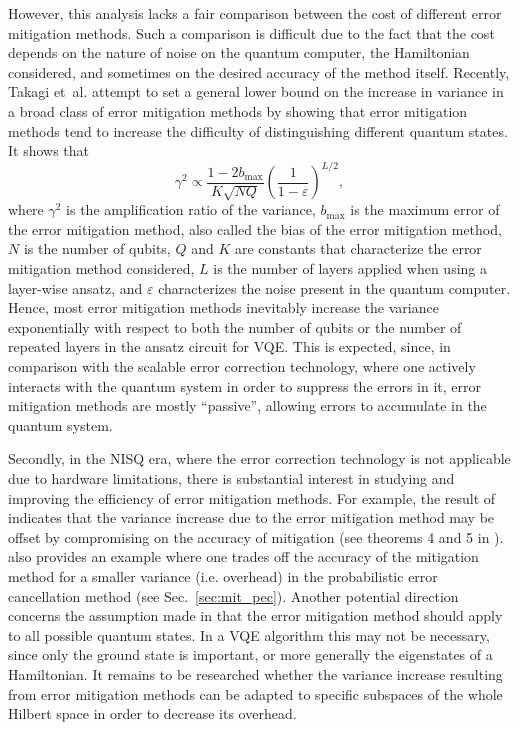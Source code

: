 However, this analysis lacks a fair comparison between the cost of different error mitigation methods. Such a comparison is difficult due to the fact that the cost depends on the nature of noise on the quantum computer, the Hamiltonian considered, and sometimes on the desired accuracy of the method itself.
Recently, Takagi et~al. \citep{RyujiFundamentalLimits2021} attempt to set a general
lower bound on the increase in variance in a broad class of error mitigation methods by showing that error mitigation methods tend to increase the difficulty of distinguishing different quantum states. It shows that
\begin{equation}
    \gamma ^{2} \varpropto \frac{1-2b_{\max}}{K\sqrt{NQ} }\left(\frac{1}{1-\varepsilon }\right)^{L/2},
\end{equation}
where $\gamma^2$ is the amplification ratio of the variance, $b_{\max}$ is the maximum error of the error mitigation method, also called the bias of the error mitigation method, $N$ is the number of qubits, $Q$ and $K$ are constants that characterize the error mitigation method considered, $L$ is the number of layers applied when using a layer-wise ansatz, and $\varepsilon$ characterizes the noise present in the quantum computer.
Hence, most error mitigation methods inevitably increase the variance exponentially
with respect to both the number of qubits or the number of repeated layers in the ansatz circuit for VQE.
This is expected, since, in comparison with the scalable error correction technology, where one actively interacts with
the quantum system in order to suppress the errors in it,
error mitigation methods are mostly ``passive'', allowing errors to accumulate in the quantum system.

Secondly, in the NISQ era, where the error correction technology is not applicable due to hardware limitations,
there is substantial interest in studying and improving the efficiency of error mitigation methods. For example,
the result of \citet{RyujiFundamentalLimits2021} indicates that the variance increase due to the error mitigation method
may be offset by compromising on the accuracy of mitigation 
(see theorems 4 and 5 in \citet{RyujiFundamentalLimits2021}). 
\citet{piveteau2021quasiprobability} also provides an example where one trades off the accuracy of the
mitigation method for a smaller variance (i.e. overhead) in the probabilistic error cancellation method 
(see Sec.~\ref{sec:mit_pec}). Another potential direction concerns the assumption made in 
\citet{RyujiFundamentalLimits2021} that the error mitigation method should apply to all possible
quantum states. In a VQE algorithm this may not be necessary, since only the ground state is important, or more generally the eigenstates of a Hamiltonian. It remains to be researched whether the variance increase resulting from error mitigation methods can be adapted to specific subspaces of the whole Hilbert space in order
to decrease its overhead.

